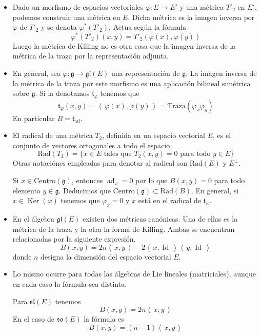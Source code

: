 \documentclass[a4paper,draft,12pt]{scrartcl}
\newcommand{\g}{\mathfrak{g}}%
\newcommand{\escalar}[2]{\left\langle\, #1,#2\, \right\rangle}  %
\newcommand{\df}[1]{\textsf{\color{blue}#1}}
\DeclareMathOperator{\Ker}{Ker}%
\DeclareMathOperator{\Id}{Id}%
\DeclareMathOperator{\ad}{ad}  %
\begin{document}
\begin{itemize}

\item Dado un morfismo de espacios vectoriales $\varphi : E \rightarrow E'$ y una métrica $T'_2$ en $E'$, podemos construir una métrica en $E$. Dicha métrica es la imagen inversa por $\varphi$ de  $T'_2$ y se denota $\varphi^*(T'_2)$.  Actua según la fórmula
$$
\varphi^*(T'_2)(x,y) = T'_2(\varphi(x),\varphi(y))
$$
Luego la métrica de Killing no es otra cosa que la imagen inversa de la métrica de la traza por la representación adjunta.


\item En general, sea $\varphi:\g \rightarrow \mathfrak{gl}(E)$ una representación de $\g$.  La imagen inversa de la métrica de la traza por este morfismo es una aplicación bilineal simétrica sobre $\g$.  Si la denotamos $\mathfrak{t}_\varphi$ tenemos que
$$
\mathfrak{t}_\varphi (x,y) = \escalar{\varphi(x)}{\varphi(y)}= \mathrm{Traza}(\varphi_x\varphi_y)
$$
En particular $B= \mathfrak{t}_{\ad}$.

\item El  \df{radical}  de una métrica $T_2$,  definida en un espacio vectorial $E$, es el conjunto de vectores ortogonales a todo el espacio
$$
\mathrm{Rad}(T_2)= \{ x \in E \text{ tales que } T_2(x,y)=0 \text{ para todo } y \in E\}
$$
Otras notaciónes  empleadas para denotar al radical son $\mathrm{Rad}(E)$ y   $E^\perp$.

Si $x \in \mathrm{Centro}(\g)$, entonces $\ad_x=0$ por lo que $B(x,y)=0$ para todo elemento $y \in \g$.  Deducimos que $\mathrm{Centro}(\g) \subset \mathrm{Rad}(B)$.  En general, si $ x \in \Ker (\varphi)$ tenemos que $\varphi_x=0$ y $x$ está en el radical de $\mathfrak{t}_\varphi$. 

\item  En el álgebra $\mathfrak{gl}(E)$ existen dos métricas canónicas.  Una de ellas es la métrica de la traza y la otra la forma de Killing.  Ambas se encuentran relacionadas por la siguiente expresión.
$$
B(x,y) = 2n \escalar{x}{y}-2\escalar{x}{\Id}\escalar{y}{\Id}
$$
donde $n$ designa la dimensión del espacio vectorial $E$.

\item Lo mismo ocurre para todas las álgebras de Lie lineales (matriciales), aunque en cada caso la fórmula sea distinta.

Para $\mathfrak{sl}(E)$ tenemos
$$
B(x,y) = 2n \escalar{x}{y}
$$
En el caso de $\mathfrak{so}(E)$ la fórmula es 
$$
B(x,y) = (n-1) \escalar{x}{y}
$$



\end{itemize}
\end{document}
